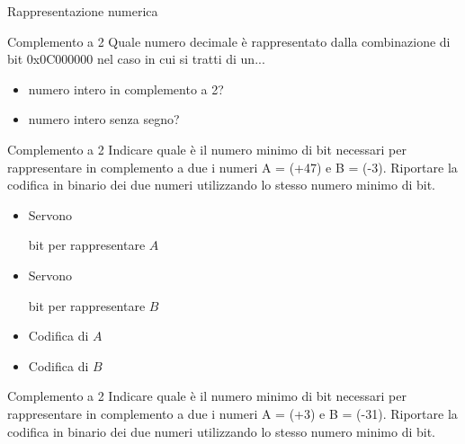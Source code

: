 \documentclass[11pt]{article}
\begin{document}
\begin{quiz}{Rappresentazione numerica}
\begin{cloze}[points=1,shuffle=false]{Complemento a 2}
Quale numero decimale è rappresentato dalla combinazione di bit 0x0C000000 nel caso in cui si tratti di un...
\begin{itemize}
\item numero intero in complemento a 2? 
\item numero intero senza segno? 
\end{itemize}
\end{cloze}

\begin{cloze}[points=1,shuffle=false]{Complemento a 2}
Indicare quale \`{e} il numero minimo di bit necessari per rappresentare in complemento a due i numeri A = (+47) e B = (-3). Riportare la codifica in binario dei due numeri utilizzando lo stesso numero minimo di bit.

\begin{itemize}
\item Servono  bit per rappresentare $A$
\item Servono  bit per rappresentare $B$
\item Codifica di $A$ 
\item Codifica di $B$ 
\end{itemize}
\end{cloze}

\begin{cloze}[points=1,shuffle=false]{Complemento a 2}
Indicare quale \`{e} il numero minimo di bit necessari per rappresentare in complemento a due i numeri A = (+3) e B = (-31). Riportare la codifica in binario dei due numeri utilizzando lo stesso numero minimo di bit.


\end{cloze}
\end{quiz}
\end{document}

